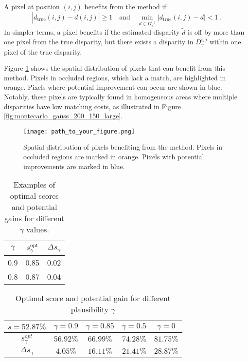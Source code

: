 \documentclass{article}
\begin{document}
A pixel at position $(i, j)$ benefits from the method if:
\begin{equation}
    |d_{\mathrm{true}}(i, j) - \tilde{d}(i, j)| \geq 1 \quad \text{and} \quad \min_{d \in D_\gamma^{i, j}} |d_{\mathrm{true}}(i, j) - d| < 1\,.
\end{equation}
In simpler terms, a pixel benefits if the estimated disparity $\tilde{d}$ is off by more than one pixel from the true disparity, but there exists a disparity in $D_\gamma^{i, j}$ within one pixel of the true disparity.

Figure \ref{fig:improvements} shows the spatial distribution of pixels that can benefit from this method. Pixels in occluded regions, which lack a match, are highlighted in orange. Pixels where potential improvement can occur are shown in blue. Notably, these pixels are typically found in homogeneous areas where multiple disparities have low matching costs, as illustrated in Figure \ref{fig:montecarlo_gauss_200_150_large}.

\begin{figure}[H]
    \centering
    \texttt{[image: path\_to\_your\_figure.png]}
    \caption{Spatial distribution of pixels benefiting from the method. Pixels in occluded regions are marked in orange. Pixels with potential improvements are marked in blue.}
    \label{fig:improvements}
\end{figure}

\begin{table}[H]
    \centering
    \begin{tabular}{|c|c|c|}
        \hline
        $\gamma$ & $s_\gamma^{\text{opt}}$ & $\Delta s_\gamma$ \\
        \hline
        0.9 & 0.85 & 0.02 \\
        0.8 & 0.87 & 0.04 \\
        \hline
    \end{tabular}
    \caption{Examples of optimal scores and potential gains for different $\gamma$ values.}
    \label{tab:optimal_score}
\end{table}


\begin{table}[ht]
\centering
\begin{tabular}{|c|c|c|c|c|}
\hline
\rowcolor[HTML]{C0C0C0} 
$s=52.87\%$                                & $\gamma=0.9$ & $\gamma=0.85$ & $\gamma=0.5$ & $\gamma=0$ \\ \hline
\cellcolor[HTML]{C0C0C0}$s_\gamma^{opt}$   & $56.92\%$    & $66.99\%$     & $74.28\%$    & $81.75\%$  \\ \hline
\cellcolor[HTML]{C0C0C0}$\Delta s_\gamma$ & $4.05\%$     & $16.11\%$     & $21.41\%$    & $28.87\%$  \\ \hline
\end{tabular}
\caption{Optimal score and potential gain for different plausibility $\gamma$}\label{tab:optimal_score}
\end{table}
\end{document}
